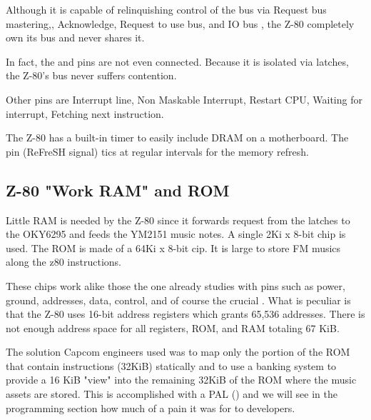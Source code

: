 Although it is capable of relinquishing control of the bus via  Request bus mastering,, Acknowledge,  Request to use bus, and IO bus , the Z-80 completely own its bus and never shares it. 

In fact, the  and  pins are not even connected.  Because it is isolated via latches, the Z-80's bus never suffers contention.


Other pins are  Interrupt line,  Non Maskable Interrupt,  Restart CPU,  Waiting for interrupt,  Fetching next instruction.

\begin{trivia}
 The Z-80 has a built-in timer to easily include DRAM on a motherboard. The  pin (ReFreSH signal) tics at regular intervals for the memory refresh.
\end{trivia}

\subsection{Z-80 "Work RAM" and ROM}
Little RAM is needed by the Z-80 since it forwards request from the latches to the OKY6295 and feeds the YM2151 music notes. A  single 2Ki x 8-bit  chip is used. The ROM is made of a 64Ki x 8-bit  cip. It is large to store FM musics along the z80 instructions. 



These chips work alike those the one already studies with pins such as power, ground, addresses, data, control, and of course the crucial . What is peculiar is that the Z-80 uses 16-bit address registers which grants 65,536 addresses. There is not enough address space for all registers, ROM, and RAM totaling 67 KiB.

The solution Capcom engineers used was to map only the portion of the ROM that contain instructions (32KiB) statically and to use a banking system to provide a 16 KiB "view" into the remaining 32KiB of the ROM where the music assets are stored. This is accomplished with a PAL () and we will see in the programming section how much of a pain it was for to developers.



